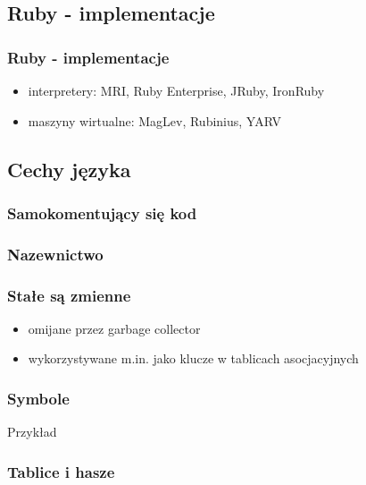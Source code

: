 \documentclass[12t]{beamer}
\begin{document}
\subsection{Ruby - implementacje}
\begin{frame}
  \frametitle{Ruby - implementacje}
  \begin{itemize}
  \item interpretery: MRI, Ruby Enterprise, JRuby, IronRuby
  \item maszyny wirtualne: MagLev, Rubinius, YARV
  \end{itemize}
\end{frame}

\subsection{Cechy języka}
\begin{frame}[fragile]
  \frametitle{Samokomentujący się kod}
  
\end{frame}

\begin{frame}[fragile]
  \frametitle{Nazewnictwo}
  \begin{footnotesize}
    
  \end{footnotesize}
\end{frame}

\begin{frame}[fragile]
  \frametitle{Stałe są zmienne}
  
\end{frame}

\begin{frame}[fragile]
  \begin{itemize}
  \item omijane przez garbage collector
  \item wykorzystywane m.in. jako klucze w tablicach asocjacyjnych
  \end{itemize}
  \frametitle{Symbole}
  \begin{block}{Przykład}
    
  \end{block}
\end{frame}

\begin{frame}[fragile]
  \frametitle{Tablice i hasze}
  
\end{frame}
\end{document}
